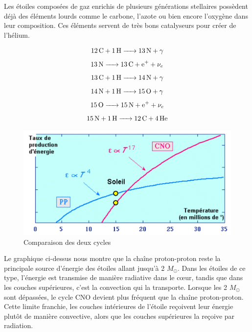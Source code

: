 Les étoiles composées de gaz enrichis de plusieurs générations stellaires possèdent déjà des éléments lourds comme le carbone, l’azote ou bien encore l’oxygène dans leur composition. Ces éléments servent de très bons catalyseurs pour créer de l’hélium.


\begin{equation}\ce{\ce{12C} + \ce{1H} -> \ce{13N} +$\gamma$}\end{equation}				     	
\begin{equation}\ce{\ce{13N} -> \ce{13C} + \ce{e+} + $\nu_{e}$ }\end{equation}					   	
\begin{equation}\ce{\ce{13C} + \ce{1H} -> \ce{14N} + $\gamma$ }\end{equation}	
\begin{equation}\ce{\ce{14N} + \ce{1H} -> \ce{15O} + $\gamma$}\end{equation}		
\begin{equation}\ce{\ce{15O} -> \ce{15N} + \ce{e+} + $\nu_{e}$	}\end{equation}	
\begin{equation}\ce{\ce{15N} + \ce{1H} -> \ce{12C} + \ce{4He}}\end{equation}\smallskip
	
	
\begin{figure}[H]
	\centering
	\includegraphics[scale=0.8]{images/cno-pp}
	\caption{Comparaison des deux cycles}
\end{figure}\bigskip

Le graphique ci-dessus nous montre que la chaîne proton-proton reste la principale source d’énergie des étoiles allant jusqu’à 2 $M_\odot$. Dans les étoiles de ce type, l’énergie est transmise de manière radiative dans le cœur, tandis que dans les couches supérieures, c’est la convection qui la transporte. Lorsque les 2 $M_\odot$ sont dépassées, le cycle CNO devient plus fréquent que la chaîne proton-proton. Cette limite franchie, les couches intérieures de l’étoile reçoivent leur énergie plutôt de manière convective, alors que les couches supérieures la reçoive par radiation.

